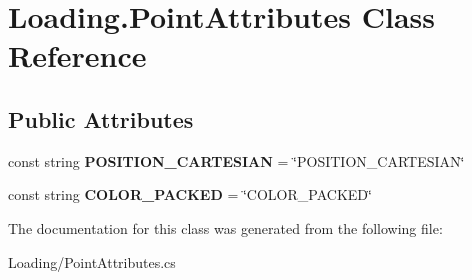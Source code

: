 \hypertarget{class_loading_1_1_point_attributes}{}\section{Loading.\+Point\+Attributes Class Reference}
\label{class_loading_1_1_point_attributes}
\subsection*{Public Attributes}
\begin{DoxyCompactItemize}
\item 
\mbox{\label{class_loading_1_1_point_attributes_ad05ff721affc38ec90a24828f2b13085}} 
const string {\bfseries P\+O\+S\+I\+T\+I\+O\+N\+\_\+\+C\+A\+R\+T\+E\+S\+I\+AN} = \char`\"{}P\+O\+S\+I\+T\+I\+O\+N\+\_\+\+C\+A\+R\+T\+E\+S\+I\+AN\char`\"{}
\item 
\mbox{\label{class_loading_1_1_point_attributes_a63fa00f1f84ef19017c52116aa5eaf95}} 
const string {\bfseries C\+O\+L\+O\+R\+\_\+\+P\+A\+C\+K\+ED} = \char`\"{}C\+O\+L\+O\+R\+\_\+\+P\+A\+C\+K\+ED\char`\"{}
\end{DoxyCompactItemize}


The documentation for this class was generated from the following file\+:\begin{DoxyCompactItemize}
\item 
Loading/Point\+Attributes.\+cs\end{DoxyCompactItemize}
